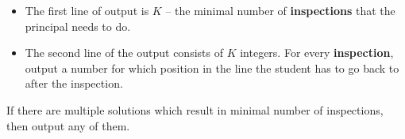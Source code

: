 \begin{itemize}
\item The first line of output is $K$ -- the minimal number of \textbf{inspections} that the principal needs to do.
\item The second line of the output consists of $K$ integers. For every \textbf{inspection}, output a number for which position in the line the student has to go back to after the inspection.
\end{itemize}

If there are multiple solutions which result in minimal number of inspections, then output any of them.

